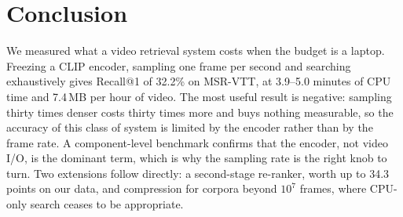 \documentclass[journal]{IEEEtran}
\begin{document}
\section{Conclusion}

We measured what a video retrieval system costs when the budget is a laptop. Freezing a CLIP
encoder, sampling one frame per second and searching exhaustively gives Recall@1 of 32.2\% on
MSR-VTT, at 3.9--5.0 minutes of CPU time and 7.4\,MB per hour of video. The most useful result is
negative: sampling thirty times denser costs thirty times more and buys nothing measurable, so
the accuracy of this class of system is limited by the encoder rather than by the frame rate. A
component-level benchmark confirms that the encoder, not video I/O, is the dominant term, which
is why the sampling rate is the right knob to turn. Two extensions follow directly: a second-stage
re-ranker, worth up to 34.3 points on our data, and compression for corpora beyond $10^{7}$
frames, where CPU-only search ceases to be appropriate.



\end{document}
